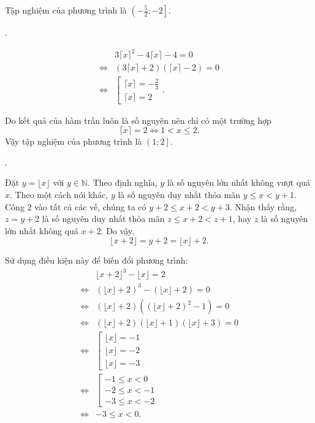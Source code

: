 Tập nghiệm của phương trình là $\left(-\frac{5}{2}; -2\right]$.

.

\begin{align*}
   &3\lceil x \rceil^2 - 4\lceil x \rceil - 4 = 0 \\
   \iff &\left(3\lceil x \rceil + 2\right)\left(\lceil x \rceil - 2\right) = 0 \\
   \iff &\left[\begin{array}{l}
      \lceil x \rceil = -\frac{2}{3} \\
      \lceil x \rceil = 2
   \end{array}\right..
\end{align*}

Do kết quả của hàm trần luôn là số nguyên nên chỉ có một trường hợp
\begin{equation*}
   \lceil x \rceil = 2 \iff 1 < x \leq 2.
\end{equation*}
Vậy tập nghiệm của phương trình là $\left(1; 2\right]$.

.

Đặt $y = \lfloor x \rfloor$ với $y \in \mathbb{N}$. Theo định nghĩa, $y$ là số nguyên lớn nhất không vượt quá $x$. Theo một cách nói khác, $y$ là số nguyên duy nhất thỏa mãn $y \leq x < y + 1$. Công $2$ vào tất cả các vế, chúng ta có $y + 2 \leq x + 2 < y + 3$. Nhận thấy rằng, $z = y + 2$ là số nguyên duy nhất thỏa mãn $z \leq x + 2 < z + 1$, hay $z$ là số nguyên lớn nhất không quá $x + 2$. Do vậy, 
\begin{equation}
   \lfloor x + 2 \rfloor = y + 2 = \lfloor x \rfloor + 2.
\end{equation}

Sử dụng điều kiện này để biến đổi phương trình:
\begin{align*}
   &\lfloor x + 2 \rfloor^3 - \lfloor x \rfloor = 2\\
   \iff &\left(\lfloor x \rfloor + 2\right)^3 - \left(\lfloor x \rfloor + 2\right) = 0 \\
   \iff &\left(\lfloor x \rfloor + 2\right)\left(\left(\lfloor x \rfloor + 2\right)^2 - 1\right) = 0 \\
   \iff &\left(\lfloor x \rfloor + 2\right)\left(\lfloor x \rfloor + 1\right)\left(\lfloor x \rfloor + 3\right) = 0 \\
   \iff &\left[\begin{array}{l}
      \lfloor x \rfloor = -1 \\
      \lfloor x \rfloor = -2 \\
      \lfloor x \rfloor = -3
   \end{array}\right. \\
   \iff &\left[\begin{array}{l}
      -1 \leq x < 0 \\
      -2 \leq x < -1 \\
      -3 \leq x < -2
   \end{array}\right. \\
   \iff & -3 \leq x < 0.
\end{align*}

